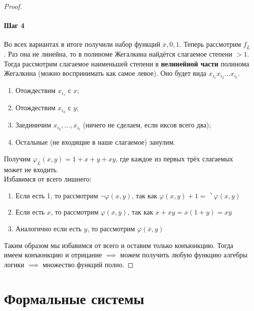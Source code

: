 \documentclass[11pt]{article}
\begin{document}
\begin{proof}
    \paragraph{Шаг 4}
    Во всех вариантах в итоге получили набор функций $\overline{x}, 0, 1$. Теперь 
    рассмотрим $f_{\overline{L}}$. Раз она не линейна, то в полиноме Жегалкина 
    найдётся слагаемое степени $> 1$. Тогда рассмотрим слагаемое наименьшей степени 
    в \textbf{нелинейной части} полинома Жегалкина (можно воспринимать как самое левое). 
    Оно будет вида $x_{i_1}x_{i_2}...x_{i_t}$. 
    \begin{enumerate}
        \item Отождествим $x_{i_1}$ с $x$;
        \item Отождествим $x_{i_2}$ с $y$;
        \item Заединичим $x_{i_3},...,x_{i_t}$ (ничего не сделаем, если иксов всего два);
        \item Остальные (не входящие в наше слагаемое) занулим.
    \end{enumerate}
    Получим $\varphi_{\overline{L}}(x, y) = 1 + x + y + xy$, где каждое из первых трёх 
    слагаемых может не входить. \\
    Избавимся от всего лишнего: 
    \begin{enumerate}
        \item Если есть 1, то рассмотрим $\lnot \varphi(x, y)$, так как 
        $\varphi(x, y) + 1 = \urcorner \varphi(x, y)$
        \item Если есть $x$, то рассмотрим $\varphi(x, \overline{y})$, так как 
        $x + xy = x(1 + y) = x \overline{y}$
        \item Аналогично если есть $y$, то рассмотрим $\varphi(\overline{x}, y)$
    \end{enumerate}
    Таким образом мы избавимся от всего и оставим только конъюнкцию. Тогда имеем 
    конъюнкцию и отрицание $\implies$ можем получить любую функцию алгебры логики 
    $\implies$ множество функций полно.
\end{proof}

\section{Формальные системы}
\end{document}
